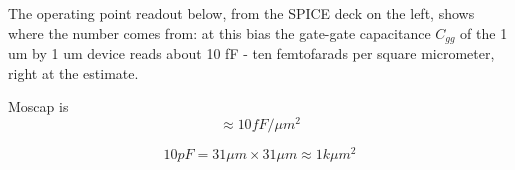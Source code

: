\begin{Shaded}
\begin{Highlighting}[]
\ExtensionTok{*}




\end{Highlighting}
\end{Shaded}

The operating point readout below, from the SPICE deck on the left,
shows where the number comes from: at this bias the gate-gate
capacitance \(C_{gg}\) of the 1 um by 1 um device reads about 10 fF -
ten femtofarads per square micrometer, right at the estimate.

Moscap is \[ \approx 10 fF / \mu m^2 \]

\[ 10 pF = 31 \mu m \times 31 \mu m \approx 1 k \mu m^2\]


